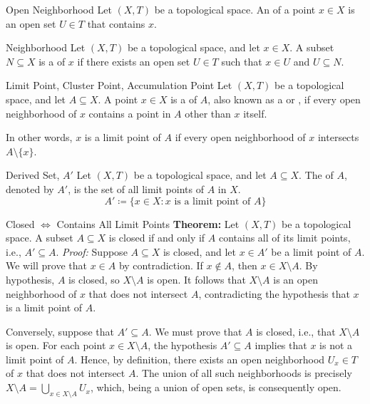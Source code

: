 \documentclass[12pt]{report}
\begin{document}
\begin{dfnbox}{Open Neighborhood}
	Let $(X, T)$ be a topological space. An  of a point $x \in X$ is an open set $U \in T$ that contains $x$.
\end{dfnbox}

\begin{dfnbox}{Neighborhood}
	Let $(X, T)$ be a topological space, and let $x \in X$. A subset $N \subseteq X$ is a  of $x$ if there exists an open set $U \in T$ such that $x \in U$ and $U \subseteq N$.
\end{dfnbox}

\begin{dfnbox}{Limit Point, Cluster Point, Accumulation Point}
	Let $(X, T)$ be a topological space, and let $A \subseteq X$. A point $x \in X$ is a  of $A$, also known as a  or , if every open neighborhood of $x$ contains a point in $A$ other than $x$ itself.
\end{dfnbox}

In other words, $x$ is a limit point of $A$ if every open neighborhood of $x$ intersects $A \setminus \{x\}$.

\begin{dfnbox}{Derived Set, $A'$}
	Let $(X, T)$ be a topological space, and let $A \subseteq X$. The  of $A$, denoted by $A'$, is the set of all limit points of $A$ in $X$.
	\[ A' \coloneq \{ x \in X : x \text{ is a limit point of } A \} \]
\end{dfnbox}

\begin{thmbox}{Closed $\iff$ Contains All Limit Points}
	\textbf{Theorem:} Let $(X, T)$ be a topological space. A subset $A \subseteq X$ is closed if and only if $A$ contains all of its limit points, i.e., $A' \subseteq A$.
\tcblower
	\textit{Proof:} Suppose $A \subseteq X$ is closed, and let $x \in A'$ be a limit point of $A$. We will prove that $x \in A$ by contradiction. If $x \notin A$, then $x \in X \setminus A$. By hypothesis, $A$ is closed, so $X \setminus A$ is open. It follows that $X \setminus A$ is an open neighborhood of $x$ that does not intersect $A$, contradicting the hypothesis that $x$ is a limit point of $A$.
	
	Conversely, suppose that $A' \subseteq A$. We must prove that $A$ is closed, i.e., that $X \setminus A$ is open. For each point $x \in X \setminus A$, the hypothesis $A' \subseteq A$ implies that $x$ is not a limit point of $A$. Hence, by definition, there exists an open neighborhood $U_x \in T$ of $x$ that does not intersect $A$. The union of all such neighborhoods is precisely $X \setminus A = \bigcup_{x \in X \setminus A} U_x$, which, being a union of open sets, is consequently open.
\end{thmbox}
\end{document}
